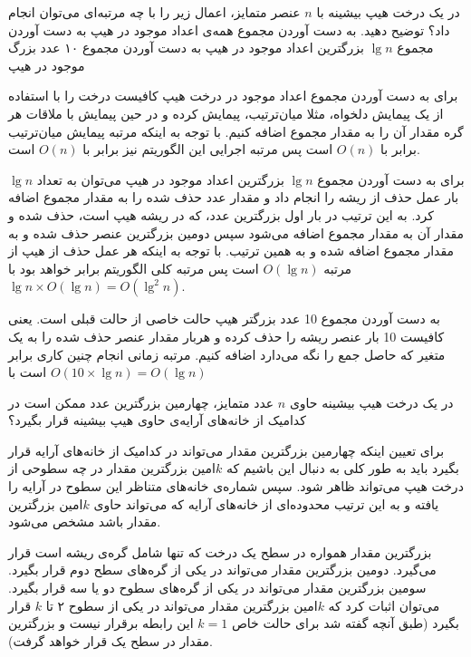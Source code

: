 
 در یک درخت هیپ بیشینه با {$n$} عنصر متمایز، اعمال زیر را با چه مرتبه‌ای می‌توان انجام داد؟ توضیح دهید.
 به دست آوردن مجموع همه‌ی اعداد موجود در هیپ
 به دست آوردن مجموع {$\lg n$} بزرگترین اعداد موجود در هیپ
 به دست آوردن مجموع ۱۰ عدد بزرگ موجود در هیپ


برای به دست آوردن مجموع  اعداد موجود در درخت هیپ کافیست درخت را با استفاده از یک پیمایش دلخواه، مثلا میان‌ترتیب، پیمایش کرده و در حین پیمایش با ملاقات هر گره مقدار آن را به مقدار مجموع اضافه کنیم. با توجه به اینکه مرتبه پیمایش میان‌ترتیب برابر با {$O(n)$} است پس مرتبه اجرایی این الگوریتم نیز برابر با {$O(n)$} است.

برای به دست آوردن مجموع {$\lg n$} بزرگترین اعداد موجود در هیپ می‌توان به تعداد {$\lg n$} بار عمل حذف از ریشه را انجام داد و مقدار عدد حذف شده را به مقدار مجموع اضافه کرد. به این ترتیب در بار اول بزرگترین عدد، که در ریشه هیپ است، حذف شده و مقدار آن به مقدار مجموع اضافه می‌شود سپس دومین بزرگترین عنصر حذف شده و به مقدار مجموع اضافه شده و به همین ترتیب. با توجه به اینکه هر عمل حذف از هیپ از مرتبه {$O(\lg n)$} است پس مرتبه کلی الگوریتم برابر خواهد بود با {$\lg n \times O(\lg n)=O({\lg}^2 n)$}.

به دست آوردن مجموع 10 عدد بزرگتر هیپ حالت خاصی از حالت قبلی است. یعنی کافیست 10 بار عنصر ریشه را حذف کرده و هربار مقدار عنصر حذف شده را به یک متغیر که حاصل جمع را نگه می‌دارد اضافه کنیم. مرتبه زمانی انجام چنین کاری برابر است با {$O(10 \times \lg n)=O(\lg n)$}

 در یک درخت هیپ بیشینه حاوی {$n$} عدد متمایز، چهارمین بزرگترین عدد ممکن است در کدامیک از خانه‌های آرایه‌ی حاوی هیپ بیشینه قرار بگیرد؟‌


برای تعیین اینکه چهارمین بزرگترین مقدار می‌تواند در کدامیک از خانه‌های آرایه قرار بگیرد باید به طور کلی به دنبال این باشیم که {$k$}امین بزرگترین مقدار در چه سطوحی از درخت هیپ می‌تواند ظاهر شود. سپس شماره‌ی خانه‌های متناظر این سطوح در آرایه را یافته و به این ترتیب محدوده‌ای از خانه‌های آرایه که می‌تواند حاوی {$k$}امین بزرگترین مقدار باشد مشخص می‌شود.

بزرگترین مقدار همواره در سطح یک درخت که تنها شامل گره‌ی ریشه است قرار می‌گیرد. دومین بزرگترین مقدار می‌تواند در یکی از گره‌های سطح دوم قرار بگیرد. سومین بزرگترین مقدار می‌تواند در یکی از گره‌های سطوح دو یا سه قرار بگیرد. می‌توان اثبات کرد که {$k$}امین بزرگترین مقدار می‌تواند در یکی از سطوح ۲ تا {$k$} قرار بگیرد (طبق آنچه گفته شد برای حالت خاص {$k=1$} این رابطه برقرار نیست و بزرگترین مقدار در سطح یک قرار خواهد گرفت).


